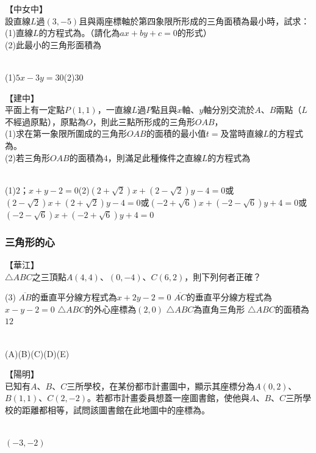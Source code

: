 \documentclass
[answers]
{exam}
\newcommand\ul[1]{\uline{\hspace*{#1}}}
\theoremstyle{definition}
\begin{document}
\begin{questions}
\question
【中女中】\\
設直線$L$過$\left( 3,-5\right)$且與兩座標軸於第四象限所形成的三角面積為最小時，試求：\\
(1)直線$L$的方程式為\ul{50pt}。（請化為$ax+by+c=0$的形式）\\
(2)此最小的三角形面積為\ul{50pt}\\
\begin{solution}~\\
	(1)$5x-3y = 30$(2)$30$
\end{solution}

\question
【建中】\\
平面上有一定點$P\left( 1,1\right)$，一直線$L$過$P$點且與$x$軸、$y$軸分別交流於$A$、$B$兩點（$L$不經過原點），原點為$O$，則此三點所形成的三角形$OAB$，\\
(1)求在第一象限所圍成的三角形$OAB$的面積的最小值$t=$\ul{50pt}及當時直線$L$的方程式為\ul{50pt}。\\
(2)若三角形$OAB$的面積為$4$，則滿足此種條件之直線$L$的方程式為\ul{50pt}
\begin{solution}~\\
	(1)$2$；$x+y-2=0$(2)$\left( 2 + \sqrt{2}\right) x + \left( 2-\sqrt{2}\right) y -4=0$或$\left( 2 - \sqrt{2}\right) x + \left( 2+\sqrt{2}\right) y -4=0$或$\left( -2 + \sqrt{6}\right) x + \left( -2 -\sqrt{6}\right) y +4=0$或$\left( -2 - \sqrt{6}\right) x + \left( -2 +\sqrt{6}\right) y +4=0$
\end{solution}

\subsubsection{三角形的心}

\question
【華江】\\
$\triangle ABC$之三頂點$A\left( 4,4\right)$、$\left( 0,-4\right)$、$C\left( 6,2\right)$，則下列何者正確？

\begin{tasks}(3)
	\task $\overline{AB}$的垂直平分線方程式為$x+2y-2=0$
	\task $\overline{AC}$的垂直平分線方程式為$x-y-2=0$
	\task $\triangle ABC$的外心座標為$\left( 2,0\right)$
	\task $\triangle ABC$為直角三角形
	\task $\triangle ABC$的面積為$12$
\end{tasks}
\begin{solution}~\\
	(A)(B)(C)(D)(E)
\end{solution}

\question
【陽明】\\
已知有$A$、$B$、$C$三所學校，在某份都市計畫圖中，顯示其座標分為$A\left( 0,2\right)$、$B\left( 1,1\right)$、$C\left( 2,-2\right)$。若都市計畫委員想蓋一座圖書館，使他與$A$、$B$、$C$三所學校的距離都相等，試問該圖書館在此地圖中的座標為\ul{50pt}。
\begin{solution}~\\
	$\left( -3,-2\right)$
\end{solution}


\end{questions}
\end{document}
